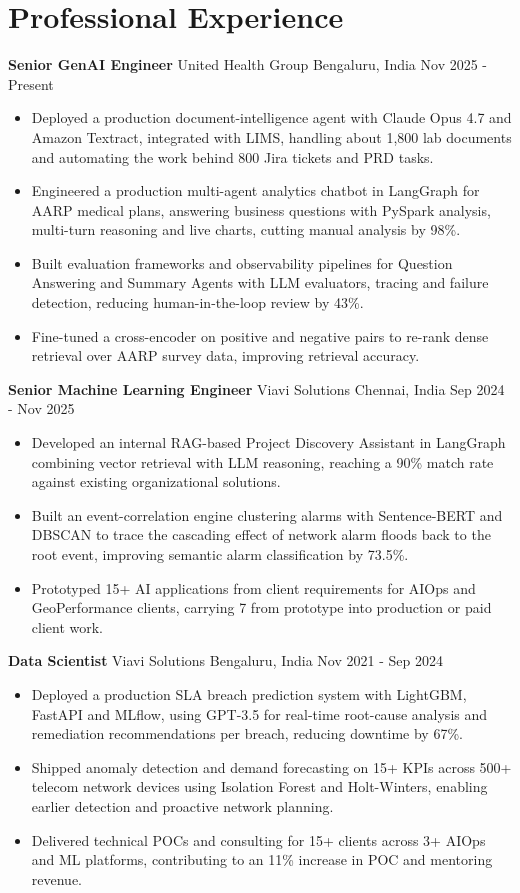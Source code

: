 \documentclass[10pt,a4paper]{article}
\newcommand{\role}[4]{\textbf{#1} \textbar{} #2 \hfill #3 \textbar{} #4\par}
\begin{document}
\section{Professional Experience}
\role{Senior GenAI Engineer}{United Health Group}{Bengaluru, India}{Nov 2025 - Present}
\begin{itemize}
  \item Deployed a production document-intelligence agent with Claude Opus 4.7 and Amazon Textract, integrated with LIMS, handling about 1,800 lab documents and automating the work behind 800 Jira tickets and PRD tasks.
  \item Engineered a production multi-agent analytics chatbot in LangGraph for AARP medical plans, answering business questions with PySpark analysis, multi-turn reasoning and live charts, cutting manual analysis by 98\%.
  \item Built evaluation frameworks and observability pipelines for Question Answering and Summary Agents with LLM evaluators, tracing and failure detection, reducing human-in-the-loop review by 43\%.
  \item Fine-tuned a cross-encoder on positive and negative pairs to re-rank dense retrieval over AARP survey data, improving retrieval accuracy.
\end{itemize}
\vspace{3pt}
\role{Senior Machine Learning Engineer}{Viavi Solutions}{Chennai, India}{Sep 2024 - Nov 2025}
\begin{itemize}
  \item Developed an internal RAG-based Project Discovery Assistant in LangGraph combining vector retrieval with LLM reasoning, reaching a 90\% match rate against existing organizational solutions.
  \item Built an event-correlation engine clustering alarms with Sentence-BERT and DBSCAN to trace the cascading effect of network alarm floods back to the root event, improving semantic alarm classification by 73.5\%.
  \item Prototyped 15+ AI applications from client requirements for AIOps and GeoPerformance clients, carrying 7 from prototype into production or paid client work.
\end{itemize}
\vspace{3pt}
\role{Data Scientist}{Viavi Solutions}{Bengaluru, India}{Nov 2021 - Sep 2024}
\begin{itemize}
  \item Deployed a production SLA breach prediction system with LightGBM, FastAPI and MLflow, using GPT-3.5 for real-time root-cause analysis and remediation recommendations per breach, reducing downtime by 67\%.
  \item Shipped anomaly detection and demand forecasting on 15+ KPIs across 500+ telecom network devices using Isolation Forest and Holt-Winters, enabling earlier detection and proactive network planning.
  \item Delivered technical POCs and consulting for 15+ clients across 3+ AIOps and ML platforms, contributing to an 11\% increase in POC and mentoring revenue.
\end{itemize}
\end{document}
